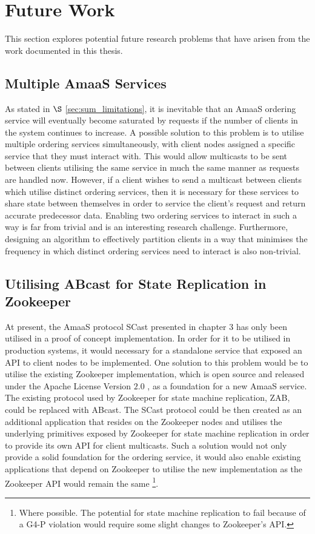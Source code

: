 \section{Future Work}
This section explores potential future research problems that have arisen from the work documented in this thesis.

    \subsection{Multiple AmaaS Services}
    As stated in $\S$ \ref{sec:sum_limitations}, it is inevitable that an \textsf{AmaaS} ordering service will eventually become saturated by requests if the number of clients in the system continues to increase.  A possible solution to this problem is to utilise multiple ordering services simultaneously, with client nodes assigned a specific service that they must interact with.  This would allow multicasts to be sent between clients utilising the same service in much the same manner as requests are handled now.  However, if a client wishes to send a multicast between clients which utilise distinct ordering services, then it is necessary for these services to share state between themselves in order to service the client's request and return accurate predecessor data.  Enabling two ordering services to interact in such a way is far from trivial and is an interesting research challenge.  Furthermore, designing an algorithm to effectively partition clients in a way that minimises the frequency in which distinct ordering services need to interact is also non-trivial.  
        
    \subsection{Utilising ABcast for State Replication in Zookeeper}\label{sec:sum_fw_zoo}
    At present, the \textsf{AmaaS} protocol \textsf{SCast} presented in chapter 3 has only been utilised in a proof of concept implementation.  In order for it to be utilised in production systems, it would necessary for a standalone service that exposed an API to client nodes to be implemented.  One solution to this problem would be to utilise the existing Zookeeper implementation, which is open source and released under the Apache License Version $2.0$ \citep{ApacheLicense}, as a foundation for a new \textsf{AmaaS} service.  The existing protocol used by Zookeeper for state machine replication, ZAB, could be replaced with \textsf{ABcast}.  The \textsf{SCast} protocol could be then created as an additional application that resides on the Zookeeper nodes and utilises the underlying primitives exposed by Zookeeper for state machine replication in order to provide its own API for client multicasts.  Such a solution would not only provide a solid foundation for the ordering service, it would also enable existing applications that depend on Zookeeper to utilise the new implementation as the Zookeeper API would remain the same \footnote{Where possible.  The potential for state machine replication to fail because of a G4-P violation would require some slight changes to Zookeeper's API.}.          
        

